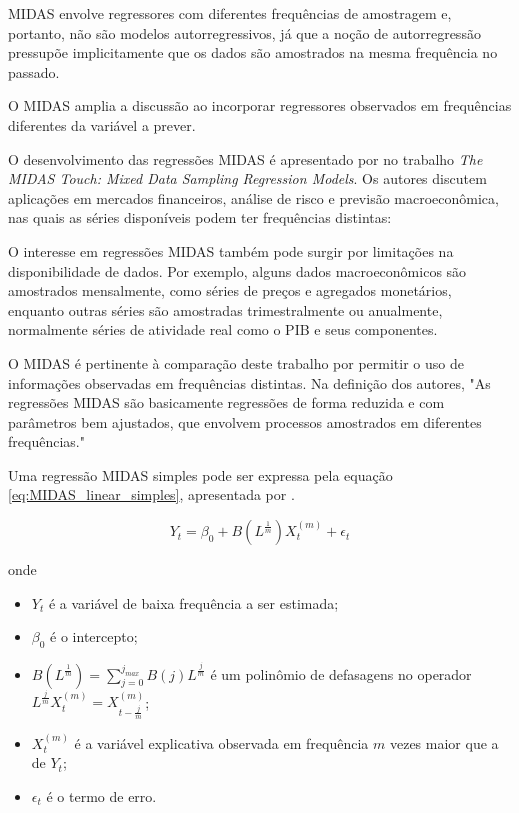\begin{citacao}
	MIDAS envolve regressores com diferentes frequências de amostragem e, portanto, não são modelos autorregressivos, já que a noção de autorregressão pressupõe implicitamente que os dados são amostrados na mesma frequência no passado. 
\end{citacao}

O MIDAS amplia a discussão ao incorporar regressores observados em frequências diferentes da variável a prever.

O desenvolvimento das regressões MIDAS é apresentado por  no trabalho \textit{The MIDAS Touch: Mixed Data Sampling Regression Models}. Os autores discutem aplicações em mercados financeiros, análise de risco e previsão macroeconômica, nas quais as séries disponíveis podem ter frequências distintas:

\begin{citacao}
	O interesse em regressões MIDAS também pode surgir por limitações na disponibilidade de dados. Por exemplo, alguns dados macroeconômicos são amostrados mensalmente, como séries de preços e agregados monetários, enquanto outras séries são amostradas trimestralmente ou anualmente, normalmente séries de atividade real como o PIB e seus componentes. 
\end{citacao}

O MIDAS é pertinente à comparação deste trabalho por permitir o uso de informações observadas em frequências distintas. Na definição dos autores, "As regressões MIDAS são basicamente regressões de forma reduzida e com parâmetros bem ajustados, que envolvem processos amostrados em diferentes frequências." 

Uma regressão MIDAS simples pode ser expressa pela equação \ref{eq:MIDAS_linear_simples}, apresentada por .

\begin{equation}
	\label{eq:MIDAS_linear_simples}
	Y_t = \beta_0 + B(L^{\frac{1}{m}})X_t^{(m)} + \epsilon_t
\end{equation}

onde
\begin{itemize}
	\item[a)] $Y_t$  é a variável de baixa frequência a ser estimada;
	\item[b)] $\beta_0$ é o intercepto;
	\item[c)] $B(L^{\frac{1}{m}}) = \sum_{j=0}^{j_{max}} B(j)L^{\frac{j}{m}}$ é um polinômio de defasagens no operador $L^{\frac{j}{m}}X_t^{(m)} = X_{t-\frac{j}{m}}^{(m)}$;
	\item[d)] $X_t^{(m)}$ é a variável explicativa observada em frequência $m$ vezes maior que a de $Y_t$;
	\item[e)] $\epsilon_t$ é o termo de erro.
\end{itemize}

